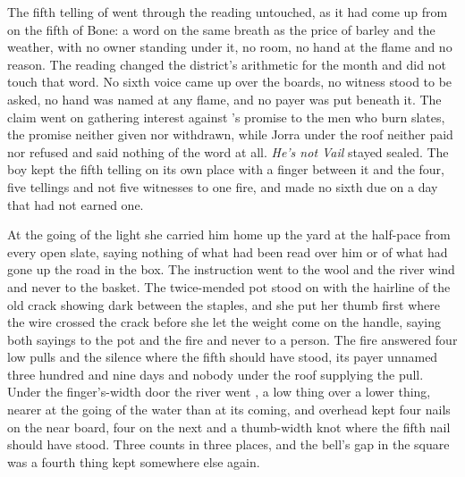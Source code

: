The fifth telling of  went through the reading untouched, as it had come up from  on the fifth of Bone: a word on the same breath as the price of barley and the weather, with no owner standing under it, no room, no hand at the flame and no reason. The reading changed the district's arithmetic for the month and did not touch that word. No sixth voice came up over the boards, no witness stood to be asked, no hand was named at any flame, and no payer was put beneath it. The claim went on gathering interest against 's promise to the men who burn slates, the promise neither given nor withdrawn, while Jorra under the roof neither paid nor refused and said nothing of the word at all. \emph{He's not Vail} stayed sealed. The boy kept the fifth telling on its own place with a finger between it and the four, five tellings and not five witnesses to one fire, and made no sixth due on a day that had not earned one.

At the going of the light she carried him home up the yard at the half-pace from every open slate, saying nothing of what had been read over him or of what had gone up the road in the box. The instruction went to the wool and the river wind and never to the basket. The twice-mended pot stood on  with the hairline of the old crack showing dark between the staples, and she put her thumb first where the wire crossed the crack before she let the weight come on the handle, saying both sayings to the pot and the fire and never to a person. The fire answered four low pulls and the silence where the fifth should have stood, its payer unnamed three hundred and nine days and nobody under the roof supplying the pull. Under the finger's-width door the river went , a low thing over a lower thing, nearer at the going of the water than at its coming, and overhead  kept four nails on the near board, four on the next and a thumb-width knot where the fifth nail should have stood. Three counts in three places, and the bell's gap in the square was a fourth thing kept somewhere else again.

